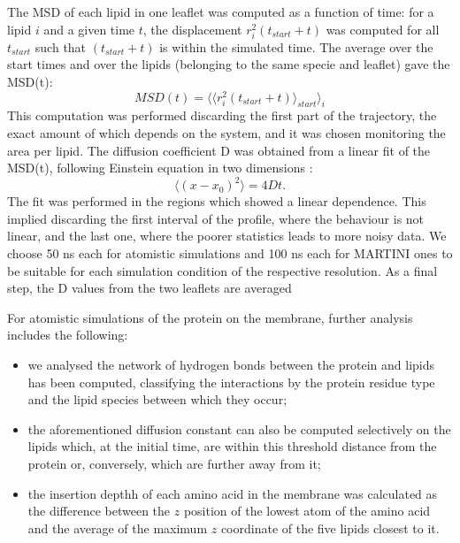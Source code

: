 \begin{itemize}
The MSD of each lipid in one leaflet was computed as a function of time: for a lipid $i$ and a given time $t$, the displacement $r_i^2(t_{start}+t)$ was computed for all $t_{start}$ such that $(t_{start}+t)$ is within the simulated time. The average over the start times and over the lipids (belonging to the same specie and leaflet) gave the MSD(t):
\begin{equation}
MSD(t) = \langle \langle r_i^2(t_{start}+t) \rangle_{start} \rangle_i
\end{equation}
This computation was performed discarding the first part of the trajectory, the exact amount of which depends on the system, and it was chosen monitoring the area per lipid.
The diffusion coefficient D was obtained from a linear fit of the MSD(t), following Einstein equation in two dimensions \citep{Einstein1956}:
\begin{equation}
\langle \left( x - x_0 \right)^2 \rangle = 4Dt.
\end{equation}
The fit was performed in the regions which showed a linear dependence. This implied discarding the first interval of the profile, where the behaviour is not linear, and the last one, where the poorer statistics leads to more noisy data. We choose 50 ns each for atomistic simulations and 100 ns each for MARTINI ones to be suitable for each simulation condition of the respective resolution. As a final step, the D values from the two leaflets are averaged
\end{itemize}

For atomistic simulations of the protein on the membrane, further analysis includes the following:
\begin{itemize}
\item we analysed the network of hydrogen bonds between the protein and lipids has been computed, classifying the interactions by the protein residue type and the lipid species between which they occur;
\item the aforementioned diffusion constant can also be computed selectively on the lipids which, at the initial time, are within this threshold distance from the protein or, conversely, which are further away from it;
\item the insertion depthh of each amino acid in the membrane was calculated as the difference between the $z$ position of the lowest atom of the amino acid and the average of the maximum $z$ coordinate of the five lipids closest to it.
\end{itemize}

